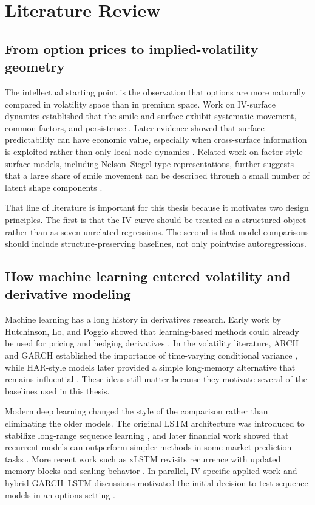 \documentclass[12pt]{report}
\begin{document}
\chapter{Literature Review}

\section{From option prices to implied-volatility geometry}
The intellectual starting point is the observation that options are more naturally compared in volatility space than in premium space. Work on IV-surface dynamics established that the smile and surface exhibit systematic movement, common factors, and persistence \citep{cont2002dynamics}. Later evidence showed that surface predictability can have economic value, especially when cross-surface information is exploited rather than only local node dynamics \citep{bernales2014}. Related work on factor-style surface models, including Nelson--Siegel-type representations, further suggests that a large share of smile movement can be described through a small number of latent shape components \citep{kearney2019}.

That line of literature is important for this thesis because it motivates two design principles. The first is that the IV curve should be treated as a structured object rather than as seven unrelated regressions. The second is that model comparisons should include structure-preserving baselines, not only pointwise autoregressions.

\section{How machine learning entered volatility and derivative modeling}
Machine learning has a long history in derivatives research. Early work by Hutchinson, Lo, and Poggio showed that learning-based methods could already be used for pricing and hedging derivatives \citep{hutchinson1994}. In the volatility literature, ARCH and GARCH established the importance of time-varying conditional variance \citep{engle1982,bollerslev1986}, while HAR-style models later provided a simple long-memory alternative that remains influential \citep{corsi2009}. These ideas still matter because they motivate several of the baselines used in this thesis.

Modern deep learning changed the style of the comparison rather than eliminating the older models. The original LSTM architecture was introduced to stabilize long-range sequence learning \citep{hochreiter1997}, and later financial work showed that recurrent models can outperform simpler methods in some market-prediction tasks \citep{fischer2018}. More recent work such as xLSTM revisits recurrence with updated memory blocks and scaling behavior \citep{beck2024xlstm}. In parallel, IV-specific applied work and hybrid GARCH--LSTM discussions motivated the initial decision to test sequence models in an options setting \citep{hull2019framing,sullivan2019lstm,zhao2024garchlstm}.
\end{document}
